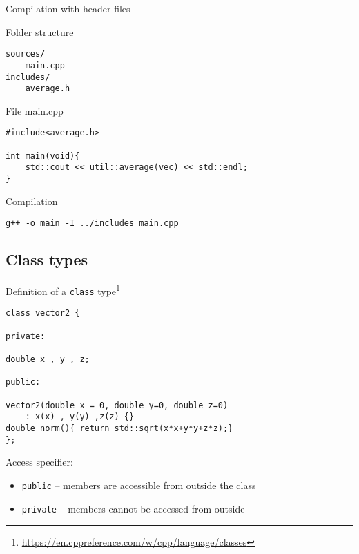 \documentclass[\classoption]{beamer}
\begin{document}
\begin{frame}[fragile]{Compilation with header files}

\begin{block}{Folder structure}
\begin{lstlisting}
sources/
    main.cpp
includes/
    average.h
\end{lstlisting}
\end{block}

\begin{block}{File main.cpp}
\begin{lstlisting}
#include<average.h>

int main(void){
    std::cout << util::average(vec) << std::endl;
}
\end{lstlisting}
\end{block}

\begin{block}{Compilation}
\begin{lstlisting}
g++ -o main -I ../includes main.cpp
\end{lstlisting}
\end{block}

\end{frame}



\subsection{Class types}

\begin{frame}[fragile]{Definition of a \lstinline|class| type\footnote{\tiny\url{https://en.cppreference.com/w/cpp/language/classes}}}

\begin{lstlisting}
class vector2 {

private:

double x , y , z;

public:

vector2(double x = 0, double y=0, double z=0)
    : x(x) , y(y) ,z(z) {}
double norm(){ return std::sqrt(x*x+y*y+z*z);}
};
\end{lstlisting}


\begin{block}{Access specifier:}
\begin{itemize}
\item \lstinline|public| --  members are accessible from outside the class
\item \lstinline|private| -- members cannot be accessed from outside 
\end{itemize}

\end{block}


\end{frame}
\end{document}
